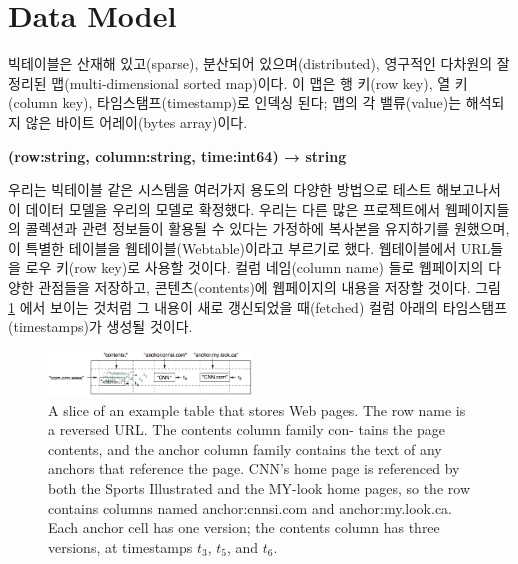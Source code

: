 \documentclass[twocolumn]{article}
\begin{document}
\section{Data Model}
빅테이블은 산재해 있고(sparse), 분산되어 있으며(distributed), 영구적인 다차원의 잘 정리된 맵(multi-dimensional sorted map)이다. 이 맵은 행 키(row key), 열 키(column key), 타임스탬프(timestamp)로 인덱싱 된다; 맵의 각 밸류(value)는 해석되지 않은 바이트 어레이(bytes array)이다.

{\small \bf
(row:string, column:string, time:int64) → string
}

우리는 빅테이블 같은 시스템을 여러가지 용도의 다양한 방법으로 테스트 해보고나서 이 데이터 모델을 우리의 모델로 확정했다. 우리는 다른 많은 프로젝트에서 웹페이지들의 콜렉션과 관련 정보들이 활용될 수 있다는 가정하에 복사본을 유지하기를 원했으며, 이 특별한 테이블을 웹테이블(Webtable)이라고 부르기로 했다. 웹테이블에서 URL들을 로우 키(row key)로 사용할 것이다. 컬럼 네임(column name) 들로 웹페이지의 다양한 관점들을 저장하고, 콘텐츠(contents)에 웹페이지의 내용을 저장할 것이다. 그림 \ref{fig01} 에서 보이는 것처럼 그 내용이 새로 갱신되었을 때(fetched) 컬럼 아래의 타임스탬프(timestamps)가 생성될 것이다.

\begin{figure}[htb]
        \centering
        \includegraphics[width=0.48\textwidth]{figure01}
        \caption{\small A slice of an example table that stores Web pages. The row name is a reversed URL. The contents column family con- tains the page contents, and the anchor column family contains the text of any anchors that reference the page. CNN’s home page is referenced by both the Sports Illustrated and the MY-look home pages, so the row contains columns named anchor:cnnsi.com and anchor:my.look.ca. Each anchor cell has one version; the contents column has three versions, at timestamps $t_3$, $t_5$, and $t_6$.}
        \label{fig01}
\end{figure}

 
\end{document}
